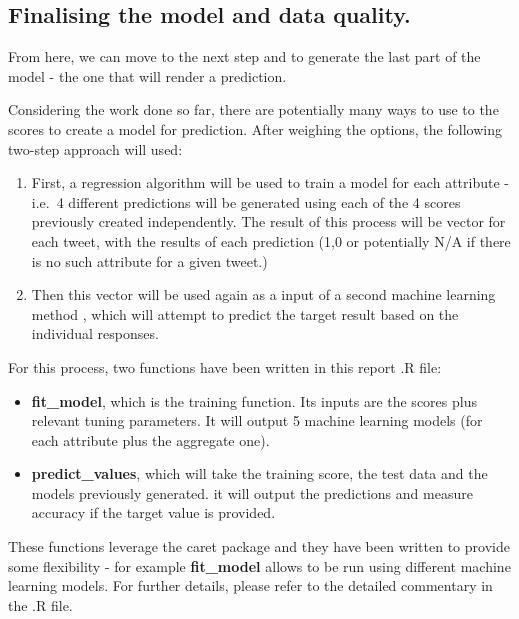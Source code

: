 \documentclass[11pt,]{article}
\providecommand{\tightlist}{%
  \setlength{\itemsep}{0pt}\setlength{\parskip}{0pt}}
\begin{document}
\hypertarget{finalising-the-model-and-data-quality.}{%
\subsection{Finalising the model and data
quality.}\label{finalising-the-model-and-data-quality.}}

From here, we can move to the next step and to generate the last part of
the model - the one that will render a prediction.

Considering the work done so far, there are potentially many ways to use
to the scores to create a model for prediction. After weighing the
options, the following two-step approach will used:

\begin{enumerate}
\def\labelenumi{\arabic{enumi}.}
\tightlist
\item
  First, a regression algorithm will be used to train a model for each
  attribute - i.e.~4 different predictions will be generated using each
  of the 4 scores previously created independently. The result of this
  process will be vector for each tweet, with the results of each
  prediction (1,0 or potentially N/A if there is no such attribute for a
  given tweet.)
\item
  Then this vector will be used again as a input of a second machine
  learning method , which will attempt to predict the target result
  based on the individual responses.
\end{enumerate}

For this process, two functions have been written in this report .R
file:

\begin{itemize}
\tightlist
\item
  \textbf{fit\_model}, which is the training function. Its inputs are
  the scores plus relevant tuning parameters. It will output 5 machine
  learning models (for each attribute plus the aggregate one).
\item
  \textbf{predict\_values}, which will take the training score, the test
  data and the models previously generated. it will output the
  predictions and measure accuracy if the target value is provided.
\end{itemize}

These functions leverage the caret package and they have been written to
provide some flexibility - for example \textbf{fit\_model} allows to be
run using different machine learning models. For further details, please
refer to the detailed commentary in the .R file.
\end{document}
